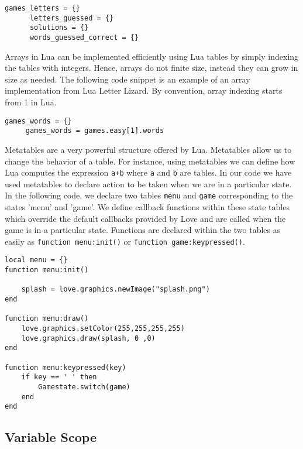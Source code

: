 \begin{lstlisting}[caption= Declaring tables in Letter lizard]
	  games_letters = {}
	  letters_guessed = {}
	  solutions = {}
	  words_guessed_correct = {}
\end{lstlisting}

Arrays in Lua can be implemented efficiently using Lua tables by simply indexing the tables with integers. Hence, arrays do not finite size, instead they can grow in size as needed. The following code snippet is an example of an array implementation from Lua Letter Lizard. By convention, array indexing starts from 1 in Lua.

\begin{lstlisting}[caption= An array structure which holds pre-generated game puzzles easily accessed by indexing the table]
	 games_words = {}
     games_words = games.easy[1].words
\end{lstlisting}

Metatables are a very powerful structure offered by Lua. Metatables allow us to change the behavior of a table. For instance, using metatables we can define how Lua computes the expression \texttt{a+b} where \texttt{a} and \texttt{b} are tables. In our code we have used metatables to declare action to be taken when we are in a particular state. In the following code, we declare two tables \texttt{menu} and \texttt{game} corresponding to the states 'menu' and 'game'. We define callback functions within these state tables which override the default callbacks provided by Love and are called when the game is in a particular state. Functions are declared within the two tables as easily as \texttt{function menu:init()} or \texttt{function game:keypressed()}.

\begin{lstlisting}[caption= Declaring and initializing metatables in Lua]
local menu = {}
function menu:init()

    splash = love.graphics.newImage("splash.png")
end

function menu:draw()
    love.graphics.setColor(255,255,255,255)
    love.graphics.draw(splash, 0 ,0)
end

function menu:keypressed(key)
    if key == ' ' then
        Gamestate.switch(game)
    end
end
\end{lstlisting}



\subsection{Variable Scope}
\label{varscope}

